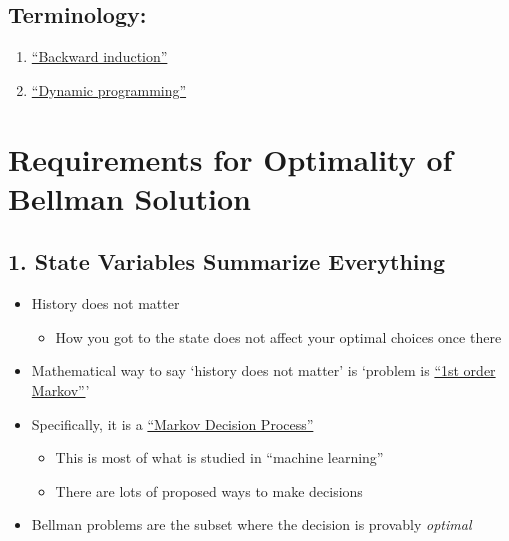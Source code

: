\documentclass{scrartcl}
\begin{document}
\subsection*{Terminology:}\label{terminology}

\begin{enumerate}
\item \href{https://en.wikipedia.org/wiki/Backward_induction}{``Backward induction''}
\item \href{https://en.wikipedia.org/wiki/Dynamic_programming}{``Dynamic programming''}
\end{enumerate}

\label{requirements-for-bellman-solution}
\section*{Requirements for Optimality of Bellman Solution}

\label{state-variables-characterize-everything}
\subsection*{1. State Variables Summarize Everything}

\begin{itemize}
\item History does not matter

  \begin{itemize}

  \item How you got to the state does not affect your optimal choices once there
  \end{itemize}
\item Mathematical way to say `history does not matter' is `problem is \href{https://ericmjl.github.io/essays-on-data-science/machine-learning/markov-models/}{``1st order Markov''}'
\item Specifically, it is a \href{https://en.wikipedia.org/wiki/Markov_decision_process}{``Markov Decision Process''}

  \begin{itemize}

  \item This is most of what is studied in ``machine learning''
  \item There are lots of proposed ways to make decisions
  \end{itemize}
\item Bellman problems are the subset where the decision is provably \emph{optimal}
\end{itemize}
\end{document}
